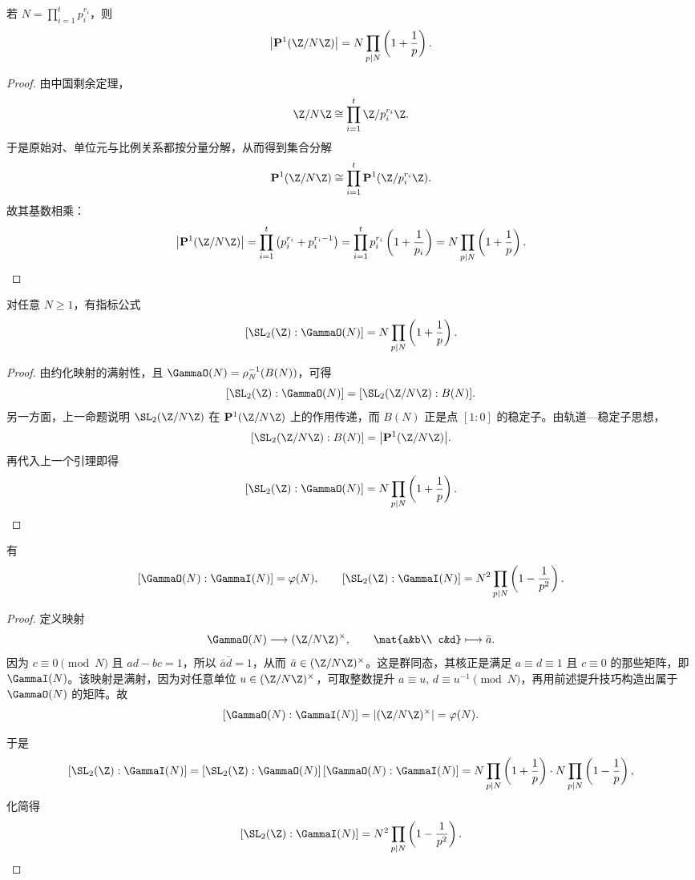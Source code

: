 \begin{lemma}
若 $N=\prod_{i=1}^t p_i^{r_i}$，则
\[
\bigl|\mathbf{P}^1(\Z/N\Z)\bigr|=N\prod_{p\mid N}\left(1+\frac1p\right).
\]
\end{lemma}

\begin{proof}
由中国剩余定理，
\[
\Z/N\Z\cong \prod_{i=1}^t \Z/p_i^{r_i}\Z.
\]
于是原始对、单位元与比例关系都按分量分解，从而得到集合分解
\[
\mathbf{P}^1(\Z/N\Z)
\cong
\prod_{i=1}^t \mathbf{P}^1(\Z/p_i^{r_i}\Z).
\]
故其基数相乘：
\[
\bigl|\mathbf{P}^1(\Z/N\Z)\bigr|
=\prod_{i=1}^t\left(p_i^{r_i}+p_i^{r_i-1}\right)
=\prod_{i=1}^t p_i^{r_i}\left(1+\frac1{p_i}\right)
=N\prod_{p\mid N}\left(1+\frac1p\right).
\]
\end{proof}

\begin{theorem}
对任意 $N\ge 1$，有指标公式
\[
[\SL_2(\Z):\GammaO(N)]
= N\prod_{p\mid N}\left(1+\frac1p\right).
\]
\end{theorem}

\begin{proof}
由约化映射的满射性，且 $\GammaO(N)=\rho_N^{-1}(B(N))$，可得
\[
[\SL_2(\Z):\GammaO(N)]
=[\SL_2(\Z/N\Z):B(N)].
\]
另一方面，上一命题说明 $\SL_2(\Z/N\Z)$ 在 $\mathbf{P}^1(\Z/N\Z)$ 上的作用传递，而 $B(N)$ 正是点 $[1:0]$ 的稳定子。由轨道—稳定子思想，
\[
[\SL_2(\Z/N\Z):B(N)]
=\bigl|\mathbf{P}^1(\Z/N\Z)\bigr|.
\]
再代入上一个引理即得
\[
[\SL_2(\Z):\GammaO(N)]
= N\prod_{p\mid N}\left(1+\frac1p\right).
\]
\end{proof}

\begin{corollary}
有
\[
[\GammaO(N):\GammaI(N)]=\varphi(N),
\qquad
[\SL_2(\Z):\GammaI(N)]
= N^2\prod_{p\mid N}\left(1-\frac1{p^2}\right).
\]
\end{corollary}

\begin{proof}
定义映射
\[
\GammaO(N)\longrightarrow (\Z/N\Z)^\times,
\qquad
\mat{a&b\\ c&d}\longmapsto \bar a.
\]
因为 $c\equiv 0\pmod N$ 且 $ad-bc=1$，所以 $\bar a\bar d=1$，从而 $\bar a\in (\Z/N\Z)^\times$。这是群同态，其核正是满足 $a\equiv d\equiv 1$ 且 $c\equiv 0$ 的那些矩阵，即 $\GammaI(N)$。该映射是满射，因为对任意单位 $u\in (\Z/N\Z)^\times$，可取整数提升 $a\equiv u$, $d\equiv u^{-1}\pmod N$，再用前述提升技巧构造出属于 $\GammaO(N)$ 的矩阵。故
\[
[\GammaO(N):\GammaI(N)]=|(\Z/N\Z)^\times|=\varphi(N).
\]

于是
\[
[\SL_2(\Z):\GammaI(N)]
=[\SL_2(\Z):\GammaO(N)]\,[\GammaO(N):\GammaI(N)]
=N\prod_{p\mid N}\left(1+\frac1p\right)\cdot N\prod_{p\mid N}\left(1-\frac1p\right),
\]
化简得
\[
[\SL_2(\Z):\GammaI(N)]
=N^2\prod_{p\mid N}\left(1-\frac1{p^2}\right).
\]
\end{proof}

